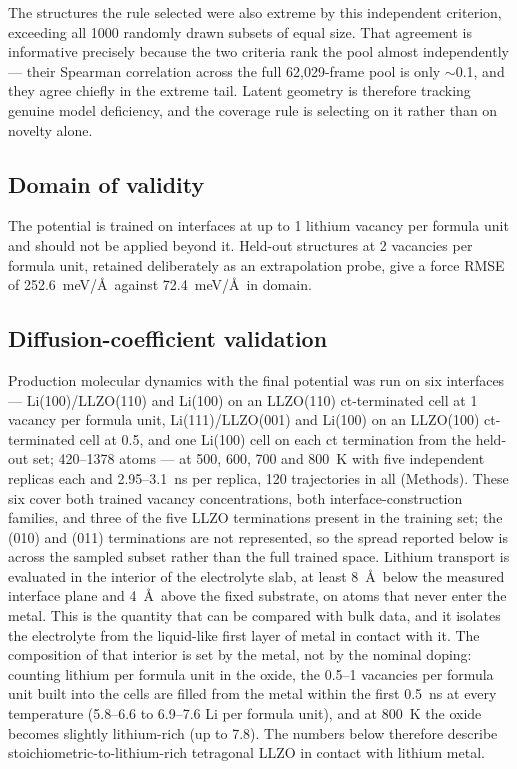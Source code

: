 \documentclass[11pt]{article}
\begin{document}
The structures the rule selected were also extreme by this independent
criterion, exceeding all 1000 randomly drawn subsets of equal size. That
agreement is informative precisely because the two criteria rank the pool
almost independently --- their Spearman correlation across the full
62{,}029-frame pool is only $\sim$0.1, and they agree chiefly in the extreme
tail. Latent geometry is therefore tracking genuine model deficiency, and the
coverage rule is selecting on it rather than on novelty alone.

\subsection{Domain of validity}
\label{sec:domain}

The potential is trained on interfaces at up to 1 lithium vacancy per formula
unit and should not be applied beyond it. Held-out structures at 2 vacancies
per formula unit, retained deliberately as an extrapolation probe, give a force
RMSE of 252.6~meV/\AA\ against 72.4~meV/\AA\ in domain.

\subsection{Diffusion-coefficient validation}
\label{sec:diffusion}

Production molecular dynamics with the final potential was run on six
interfaces --- Li(100)/LLZO(110) and Li(100) on an LLZO(110) ct-terminated
cell at 1 vacancy per formula unit, Li(111)/LLZO(001) and Li(100) on an
LLZO(100) ct-terminated cell at 0.5, and one Li(100) cell on each ct
termination from the held-out set; 420--1378 atoms --- at
500, 600, 700 and 800~K with five independent replicas each and 2.95--3.1~ns
per replica, 120 trajectories in all (Methods). These six cover both trained
vacancy concentrations, both interface-construction families, and three of the
five LLZO terminations present in the training set; the (010) and (011)
terminations are not represented, so the spread reported below is across the
sampled subset rather than the full trained space. Lithium transport is evaluated in the interior
of the electrolyte slab, at least 8~\AA\ below the measured interface plane and
4~\AA\ above the fixed substrate, on atoms that never enter the metal. This is
the quantity that can be compared with bulk data, and it isolates the
electrolyte from the liquid-like first layer of metal in contact with it.
The composition of that interior is set by the metal, not by the nominal
doping: counting lithium per formula unit in the oxide, the 0.5--1 vacancies
per formula unit built into the cells are filled from the metal within the
first 0.5~ns at every temperature (5.8--6.6 to 6.9--7.6 Li per formula unit),
and at 800~K the oxide becomes slightly lithium-rich (up to 7.8). The
numbers below therefore describe stoichiometric-to-lithium-rich tetragonal
LLZO in contact with lithium metal.
\end{document}

